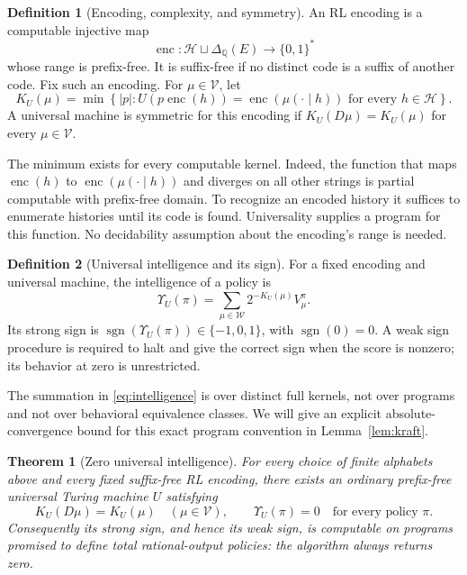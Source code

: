 \documentclass[11pt]{article}
\newtheorem{theorem}{Theorem}
\theoremstyle{definition}
\newtheorem{definition}{Definition}
\theoremstyle{remark}
\newcommand{\Q}{\mathbb Q}
\newcommand{\V}{\mathcal V}
\newcommand{\W}{\mathcal W}
\newcommand{\Hist}{\mathcal H}
\newcommand{\Dist}{\Delta_{\Q}}
\newcommand{\enc}{\operatorname{enc}}
\newcommand{\sgn}{\operatorname{sgn}}
\begin{document}
\begin{definition}[Encoding, complexity, and symmetry]
\label{def:complexity}
An RL encoding is a computable injective map
\[
  \enc:\Hist\sqcup\Dist(E)\longrightarrow\{0,1\}^*
\]
whose range is prefix-free.  It is suffix-free if no distinct code is a
suffix of another code.  Fix such an encoding.  For $\mu\in\V$, let
\begin{equation}
  K_U(\mu)=\min\left\{|p|:
     U(p\enc(h))=\enc(\mu(\cdot\mid h))
     \text{ for every }h\in\Hist\right\}.
  \label{eq:complexity}
\end{equation}
A universal machine is symmetric for this encoding if
$K_U(D\mu)=K_U(\mu)$ for every $\mu\in\V$.
\end{definition}

The minimum exists for every computable kernel.  Indeed, the function
that maps $\enc(h)$ to $\enc(\mu(\cdot\mid h))$ and diverges on all
other strings is partial computable with prefix-free domain.  To
recognize an encoded history it suffices to enumerate histories until
its code is found.  Universality supplies a program for this function.
No decidability assumption about the encoding's range is needed.

\begin{definition}[Universal intelligence and its sign]
\label{def:intelligence}
For a fixed encoding and universal machine, the intelligence of a policy
is
\begin{equation}
  \Upsilon_U(\pi)=
       \sum_{\mu\in\W}2^{-K_U(\mu)}V_\mu^\pi.
  \label{eq:intelligence}
\end{equation}
Its strong sign is $\sgn(\Upsilon_U(\pi))\in\{-1,0,1\}$, with
$\sgn(0)=0$.  A weak sign procedure is required to halt and give the
correct sign when the score is nonzero; its behavior at zero is unrestricted.
\end{definition}

The summation in \eqref{eq:intelligence} is over distinct full kernels,
not over programs and not over behavioral equivalence classes.  We
will give an explicit absolute-convergence bound for this exact program
convention in Lemma~\ref{lem:kraft}.

\begin{theorem}[Zero universal intelligence]
\label{thm:main}
For every choice of finite alphabets above and every fixed suffix-free
RL encoding, there exists an ordinary prefix-free universal Turing
machine $U$ satisfying
\[
  K_U(D\mu)=K_U(\mu)\quad(\mu\in\V),
  \qquad
  \Upsilon_U(\pi)=0\quad\text{for every policy }\pi.
\]
Consequently its strong sign, and hence its weak sign, is computable
on programs promised to define total rational-output policies: the
algorithm always returns zero.
\end{theorem}
\end{document}
